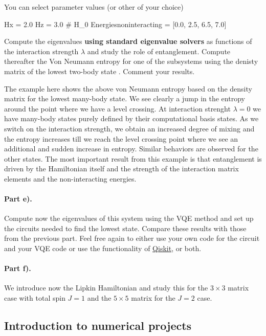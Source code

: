 \documentclass[%
oneside,                 %
final,                   %
10pt]{article}
\begin{document}
You can select parameter values (or other of your choice)





\bpycod
Hx = 2.0
Hz = 3.0
# H_0
Energiesnoninteracting = [0.0, 2.5, 6.5, 7.0]

\epycod


Compute the eigenvalues \textbf{using standard eigenvalue solvers} as functions of
the interaction strength $\lambda$ and study the role of entanglement.
Compute thereafter the Von Neumann entropy for one of the subsystems using the denisty matrix  of the lowest
two-body state . Comment your results.

The example here shows the above von Neumann entropy based on the
density matrix for the lowest many-body state. We see clearly a jump
in the entropy around the point where we have a level crossing. At
interaction strenght $\lambda=0$ we have many-body states purely
defined by their computational basis states. As we switch on the
interaction strength, we obtain an increased degree of mixing and the
entropy increases till we reach the level crossing point where we see
an additional and sudden increase in entropy. Similar behaviors are
observed for the other states. The most important result from this
example is that entanglement is driven by the Hamiltonian itself and
the strength of the interaction matrix elements and the
non-interacting energies.

\paragraph{Part e).}
Compute now the eigenvalues of this system using the VQE method and
set up the circuits needed to find the lowest state. Compare these
results with those from the previous part. Feel free again to either
use your own code for the circuit and your VQE code or use the
functionality of \href{{https://qiskit.org/}}{Qiskit}, or both.

\paragraph{Part f).}
We introduce now the Lipkin Hamiltonian and study this for the $3\times 3$ matrix case with total spin $J=1$ and the $5\times 5$ matrix for the $J=2$ case. 

\subsection{Introduction to numerical projects}
\end{document}
